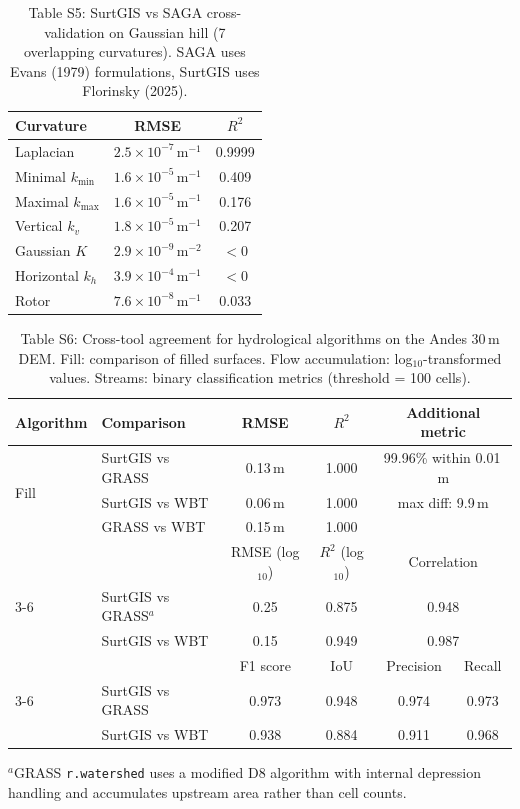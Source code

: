 \documentclass[11pt]{article}
\begin{document}
\begin{table}[htbp]
\centering
\caption*{Table S5: SurtGIS vs SAGA cross-validation on Gaussian hill (7 overlapping curvatures). SAGA uses Evans (1979) formulations, SurtGIS uses Florinsky (2025).}
\small
\begin{tabular}{@{}lcc@{}}
\toprule
Curvature & RMSE & $R^2$ \\
\midrule
Laplacian        & $2.5 \times 10^{-7}$\,m$^{-1}$ & 0.9999 \\
Minimal $k_{\min}$ & $1.6 \times 10^{-5}$\,m$^{-1}$ & 0.409 \\
Maximal $k_{\max}$ & $1.6 \times 10^{-5}$\,m$^{-1}$ & 0.176 \\
Vertical $k_v$   & $1.8 \times 10^{-5}$\,m$^{-1}$ & 0.207 \\
Gaussian $K$     & $2.9 \times 10^{-9}$\,m$^{-2}$ & $< 0$ \\
Horizontal $k_h$ & $3.9 \times 10^{-4}$\,m$^{-1}$ & $< 0$ \\
Rotor            & $7.6 \times 10^{-8}$\,m$^{-1}$ & 0.033 \\
\bottomrule
\end{tabular}
\end{table}

\begin{table}[htbp]
\centering
\caption*{Table S6: Cross-tool agreement for hydrological algorithms on the Andes 30\,m DEM. Fill: comparison of filled surfaces. Flow accumulation: log$_{10}$-transformed values. Streams: binary classification metrics (threshold = 100 cells).}
\begin{tabular}{@{}llcccc@{}}
\toprule
Algorithm & Comparison & RMSE & $R^2$ & \multicolumn{2}{c}{Additional metric} \\
\midrule
\multirow{3}{*}{Fill}
  & SurtGIS vs GRASS & 0.13\,m & 1.000 & \multicolumn{2}{c}{99.96\% within 0.01\,m} \\
  & SurtGIS vs WBT   & 0.06\,m & 1.000 & \multicolumn{2}{c}{max diff: 9.9\,m} \\
  & GRASS vs WBT     & 0.15\,m & 1.000 & & \\
\midrule
 & & RMSE (log$_{10}$) & $R^2$ (log$_{10}$) & \multicolumn{2}{c}{Correlation} \\
\cmidrule(lr){3-6}
\multirow{2}{*}{D8 flow acc.}
  & SurtGIS vs GRASS$^{a}$ & 0.25 & 0.875 & \multicolumn{2}{c}{0.948} \\
  & SurtGIS vs WBT   & 0.15 & 0.949 & \multicolumn{2}{c}{0.987} \\
\midrule
 & & F1 score & IoU & Precision & Recall \\
\cmidrule(lr){3-6}
\multirow{2}{*}{Streams}
  & SurtGIS vs GRASS & 0.973 & 0.948 & 0.974 & 0.973 \\
  & SurtGIS vs WBT   & 0.938 & 0.884 & 0.911 & 0.968 \\
\bottomrule
\end{tabular}

\medskip
\small
$^{a}$GRASS \texttt{r.watershed} uses a modified D8 algorithm with internal depression handling and accumulates upstream area rather than cell counts.
\end{table}
\end{document}
